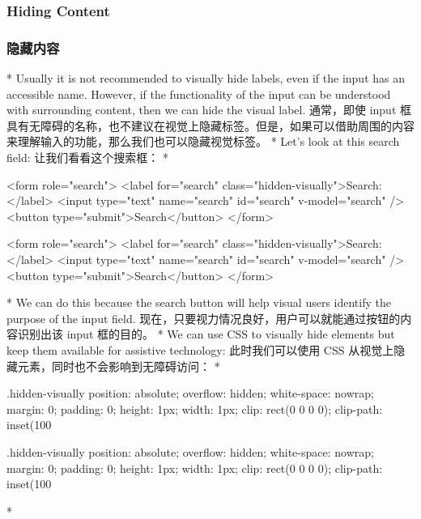 \begin{paracol}{2}
\subsubsection{Hiding Content}
\switchcolumn
\subsubsection{隐藏内容}
\switchcolumn[0]*%
Usually it is not recommended to visually hide labels, even if the input
has an accessible name. However, if the functionality of the input can
be understood with surrounding content, then we can hide the visual
label.
\switchcolumn
通常，即使 input
框具有无障碍的名称，也不建议在视觉上隐藏标签。但是，如果可以借助周围的内容来理解输入的功能，那么我们也可以隐藏视觉标签。
\switchcolumn[0]*%
Let's look at this search field:
\switchcolumn
让我们看看这个搜索框：
\switchcolumn[0]*%
\begin{codeHtml}
<form role="search">
  <label for="search" class="hidden-visually">Search: </label>
  <input type="text" name="search" id="search" v-model="search" />
  <button type="submit">Search</button>
</form>
\end{codeHtml}
\switchcolumn
\begin{codeHtml}
<form role="search">
  <label for="search" class="hidden-visually">Search: </label>
  <input type="text" name="search" id="search" v-model="search" />
  <button type="submit">Search</button>
</form>
\end{codeHtml}
\switchcolumn[0]*%
We can do this because the search button will help visual users identify
the purpose of the input field.
\switchcolumn
现在，只要视力情况良好，用户可以就能通过按钮的内容识别出该 input
框的目的。
\switchcolumn[0]*%
We can use CSS to visually hide elements but keep them available for
assistive technology:
\switchcolumn
此时我们可以使用 CSS 从视觉上隐藏元素，同时也不会影响到无障碍访问：
\switchcolumn[0]*%
\begin{codeHtml}
.hidden-visually {
  position: absolute;
  overflow: hidden;
  white-space: nowrap;
  margin: 0;
  padding: 0;
  height: 1px;
  width: 1px;
  clip: rect(0 0 0 0);
  clip-path: inset(100%
}
\end{codeHtml}
\switchcolumn
\begin{codeCss}
.hidden-visually {
  position: absolute;
  overflow: hidden;
  white-space: nowrap;
  margin: 0;
  padding: 0;
  height: 1px;
  width: 1px;
  clip: rect(0 0 0 0);
  clip-path: inset(100%
}
\end{codeCss}
\switchcolumn[0]*%

\end{paracol}
